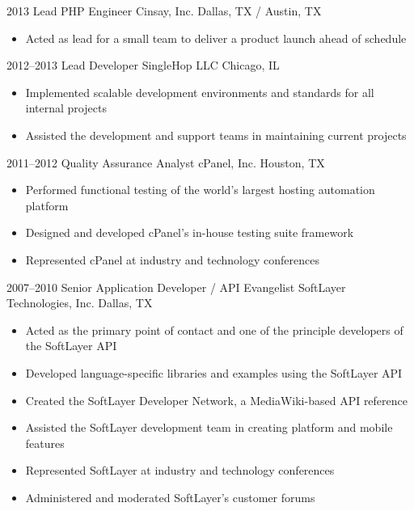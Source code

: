 \documentclass[11pt,a4paper,sans]{moderncv}
\begin{document}
    \cventry
      {2013}
      {Lead PHP Engineer}
      {Cinsay, Inc.}
      {Dallas, TX / Austin, TX}
      {}
      {
        \begin{itemize}
          \item Acted as lead for a small team to deliver a product launch ahead of schedule
        \end{itemize}
      }

    \cventry
      {2012--2013}
      {Lead Developer}
      {SingleHop LLC}
      {Chicago, IL}
      {}
      {
        \begin{itemize}
          \item Implemented scalable development environments and standards for all internal projects
          \item Assisted the development and support teams in maintaining current projects
        \end{itemize}
      }

    \cventry
      {2011--2012}
      {Quality Assurance Analyst}
      {cPanel, Inc.}
      {Houston, TX}
      {}
      {
        \begin{itemize}
          \item Performed functional testing of the world's largest hosting automation platform
          \item Designed and developed cPanel's in-house testing suite framework
          \item Represented cPanel at industry and technology conferences
        \end{itemize}
      }

    \cventry
      {2007--2010}
      {Senior Application Developer / API Evangelist}
      {SoftLayer Technologies, Inc.}
      {Dallas, TX}
      {}
      {
        \begin{itemize}
          \item Acted as the primary point of contact and one of the principle developers of the SoftLayer API
          \item Developed language-specific libraries and examples using the SoftLayer API
          \item Created the SoftLayer Developer Network, a MediaWiki-based API reference
          \item Assisted the SoftLayer development team in creating platform and mobile features
          \item Represented SoftLayer at industry and technology conferences
          \item Administered and moderated SoftLayer's customer forums
        \end{itemize}
      }
\end{document}
